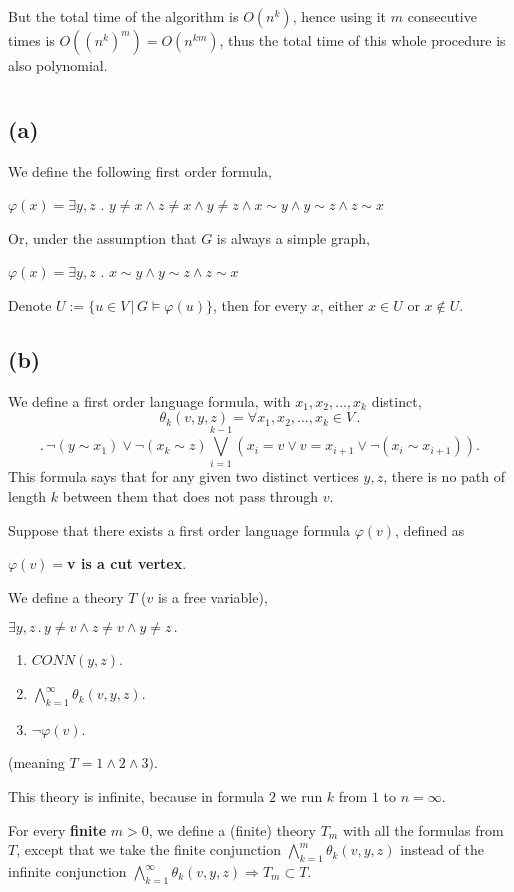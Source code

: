 \documentclass{article}
\begin{document}
But the total time of the algorithm is $O(n^k)$, hence using it $m$ consecutive times is $O((n^k)^m)=O(n^{km})$, thus the total time of this whole procedure is also polynomial.
\section{}
\subsection*{(a)}
We define the following first order formula,

$\varphi(x)=\exists{y,z}$ . $y\neq{x}\land{z\neq{x}}\land{y\neq{z}}\land{x\sim{y}}\land{y\sim{z}}\land{z\sim{x}}$

Or, under the assumption that $G$ is always a simple graph,

$\varphi(x)=\exists{y,z}$ . $x\sim{y}\land{y\sim{z}}\land{z\sim{x}}$

Denote $U:=\{u\in{V}\,|\,{G\vDash\varphi(u)}\}$, then for every $x$, either $x\in{U}$ or $x\notin{U}$.
\subsection*{(b)}
We define a first order language formula, with $x_1,x_2,\dots,x_k$ distinct,
\[\theta_k(v,y,z)=\forall{x_1,x_2,\dots,x_k}\in{V}\,.\]\[.\,\neg(y\sim{x_1})\lor\neg(x_k\sim{z})\bigvee_{i=1}^{k-1}(x_i=v\lor{v}=x_{i+1}\lor\neg(x_i\sim{x_{i+1}})).\]
This formula says that for any given two distinct vertices $y,z$, there is no path of length $k$ between them that does not pass through $v$.

Suppose that there exists a first order language formula $\varphi(v)$, defined as

$\varphi(v)=$\textbf{v is a cut vertex}.

We define a theory $T$ ($v$ is a free variable),

$\exists{y,z}\,.\,y\neq{v}\land{z}\neq{v}\land{y}\neq{z}\,.$
\begin{enumerate}
    \item $CONN(y,z)$.
    \item 
    $\bigwedge_{k=1}^\infty\theta_k(v,y,z)$.
    \item 
    $\neg\varphi(v)$.
\end{enumerate}
(meaning $T=1\land{2}\land{3})$.

This theory is infinite, because in formula $2$ we run $k$ from $1$ to $n=\infty$.


For every \textbf{finite} $m>0$, we define a (finite) theory $T_m$ with all the formulas from $T$, except that we take the finite conjunction  $\bigwedge_{k=1}^m\theta_k(v,y,z)$ instead of the infinite conjunction $\bigwedge_{k=1}^\infty\theta_k(v,y,z)\Rightarrow{T_m}\subset{T}$.
\end{document}

